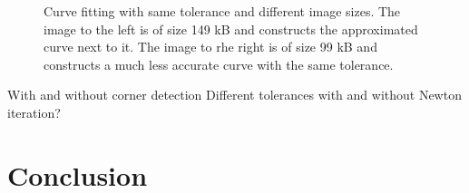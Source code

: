 \documentclass[10pt]{article}
\begin{document}
\begin{figure}
\begin{minipage}[t]{.24\textwidth}
    \label{fig:cornerdet}
\end{minipage}\hfill
\caption{Curve fitting with same tolerance and different image sizes. The image to the left is of size 149 kB and constructs the approximated curve next to it. The image to rhe right is of size 99 kB and constructs a much less accurate curve with the same tolerance.}
\label{fig:mickey}
\end{figure}




With and without corner detection
Different tolerances
with and without Newton iteration?





\section{Conclusion}
\cite{Plass:1983}


\end{document}
